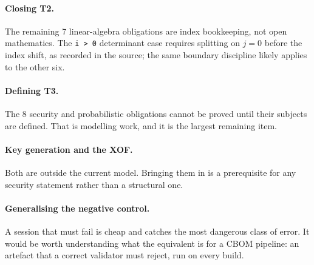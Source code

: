 \paragraph{Closing T2.} The remaining 7 linear-algebra obligations are
index bookkeeping, not open mathematics. The \texttt{i > 0} determinant case
requires splitting on $j = 0$ before the index shift, as recorded in the source;
the same boundary discipline likely applies to the other six.

\paragraph{Defining T3.} The 8 security and probabilistic obligations cannot be
proved until their subjects are defined. That is modelling work, and it is the
largest remaining item.

\paragraph{Key generation and the XOF.} Both are outside the current model.
Bringing them in is a prerequisite for any security statement rather than a
structural one.

\paragraph{Generalising the negative control.} A session that must fail is cheap
and catches the most dangerous class of error. It would be worth understanding
what the equivalent is for a CBOM pipeline: an artefact that a correct validator
must reject, run on every build.
